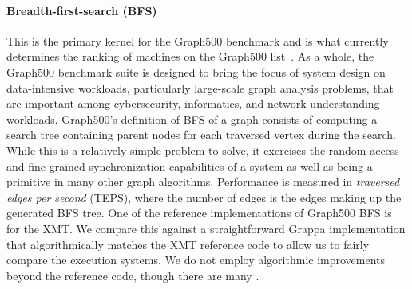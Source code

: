 \paragraph{Breadth-first-search (BFS)} This is the primary kernel for the Graph500 benchmark and is what currently determines the ranking of machines on the Graph500 list~\cite{graph500list}. As a whole, the Graph500 benchmark suite is designed to bring the focus of system design on data-intensive workloads, particularly large-scale graph analysis problems, that are important among cybersecurity, informatics, and network understanding workloads. Graph500's definition of BFS of a graph consists of computing a search tree containing parent nodes for each traversed vertex during the search. While this is a relatively simple problem to solve, it exercises the random-access and fine-grained synchronization capabilities of a system as well as being a primitive in many other graph algorithms. Performance is measured in \emph{traversed edges per second} (TEPS), where the number of edges is the edges making up the generated BFS tree. One of the reference implementations of Graph500 BFS is for the XMT. We compare this against a straightforward Grappa implementation that algorithmically matches the XMT reference code to allow us to fairly compare the execution systems. We do not employ algorithmic improvements beyond the reference code, though there are many \cite{Beamer:Graph500,Yoo:FixedPointGraph500}.


